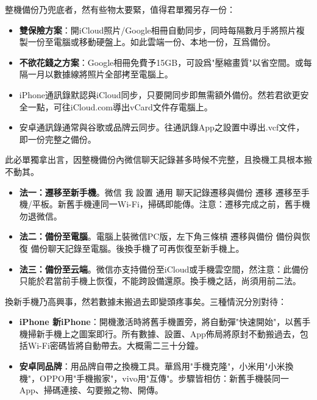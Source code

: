 
整機備份乃兜底者，然有些物太要緊，值得君單獨另存一份：


\begin{itemize}
  \item \textbf{雙保險方案}：開iCloud照片/Google相冊自動同步，同時每隔數月手將照片複製一份至電腦或移動硬盤上。如此雲端一份、本地一份，互爲備份。
  \item \textbf{不欲花錢之方案}：Google相冊免費予15GB，可設爲"壓縮畫質"以省空間。或每隔一月以數據線將照片全部拷至電腦上。
\end{itemize}


\begin{itemize}
  \item iPhone通訊錄默認與iCloud同步，只要開同步即無需額外備份。然若君欲更安全一點，可往iCloud.com導出vCard文件存電腦上。
  \item 安卓通訊錄通常與谷歌或品牌云同步。往通訊錄App之設置中導出.vcf文件，即一份完整之備份。
\end{itemize}


此必單獨拿出言，因整機備份內微信聊天記錄甚多時候不完整，且換機工具根本搬不動其。

\begin{itemize}
  \item \textbf{法一：遷移至新手機}。微信 我 設置 通用 聊天記錄遷移與備份 遷移 遷移至手機/平板。新舊手機連同一Wi-Fi，掃碼即能傳。注意：遷移完成之前，舊手機勿退微信。
  \item \textbf{法二：備份至電腦}。電腦上裝微信PC版，左下角三條槓 遷移與備份 備份與恢復 備份聊天記錄至電腦。後換手機了可再恢復至新手機上。
  \item \textbf{法三：備份至云端}。微信亦支持備份至iCloud或手機雲空間，然注意：此備份只能於君當前手機上恢復，不能跨設備還原。換手機之話，尚須用前二法。
\end{itemize}


換新手機乃高興事，然若數據未搬過去即變頭疼事矣。三種情況分別對待：


\begin{itemize}
  \item \textbf{iPhone 新iPhone}：開機激活時將舊手機置旁，將自動彈"快速開始"，以舊手機掃新手機上之圖案即行。所有數據、設置、App佈局將原封不動搬過去，包括Wi-Fi密碼皆將自動帶去。大概需二三十分鐘。
  \item \textbf{安卓同品牌}：用品牌自帶之換機工具。華爲用"手機克隆"，小米用"小米換機"，OPPO用"手機搬家"，vivo用"互傳"。步驟皆相仿：新舊手機裝同一App、掃碼連接、勾要搬之物、開傳。
\end{itemize}

